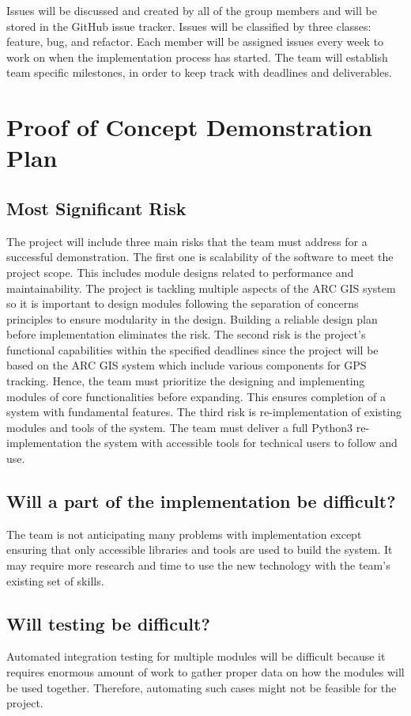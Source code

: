 \documentclass{article}
\begin{document}
Issues will be discussed and created by all of the group members and will be stored in the GitHub issue tracker. Issues will be classified by three classes: feature, bug, and refactor. Each member will be assigned issues every week to work on when the implementation process has started. The team will establish team specific milestones, in order to keep track with deadlines and deliverables. 

\section{Proof of Concept Demonstration Plan} %

\subsection{Most Significant Risk}
The project will include three main risks that the team must address for a successful demonstration. The first one is scalability of the software to meet the project scope. This includes module designs related to performance and maintainability. The project is tackling multiple aspects of the ARC GIS system so it is important to design modules following the separation of concerns principles to ensure modularity in the design. Building a reliable design plan before implementation eliminates the risk. The second risk is the project's functional capabilities within the specified deadlines since the project will be based on the ARC GIS system which include various components for GPS tracking. Hence, the team must prioritize the designing and implementing modules of core functionalities before expanding. This ensures completion of a system with fundamental features. The third risk is re-implementation of existing modules and tools of the system. The team must deliver a full Python3 re-implementation the system with accessible tools for technical users to follow and use. 

\subsection{Will a part of the implementation be difficult?}
The team is not anticipating many problems with implementation except ensuring that only accessible libraries and tools are used to build the system. It may require more research and time to use the new technology with the team's existing set of skills. 

\subsection{Will testing be difficult?}
Automated integration testing for multiple modules will be difficult because it requires enormous amount of work to gather proper data on how the modules will be used together. Therefore, automating such cases might not be feasible for the project.
\end{document}
